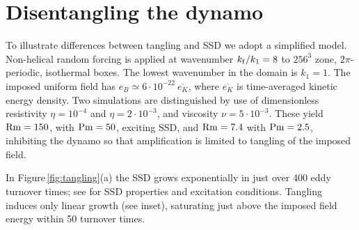 \documentclass[preprint2]{aastex63}
\newcommand\Rm{{\rm Rm} }
\newcommand\Pm{{\rm Pm} }
\newcommand\kf{k_{\rm f} }
\begin{document}
\section{Disentangling the dynamo} \label{sec:ssd-tang}

 To illustrate differences between tangling and SSD we adopt a simplified
 model.
 Non-helical random forcing is applied at wavenumber $\kf/k_1=8$ to
 $256^3$ zone, $2\pi$-periodic, isothermal boxes.
 The lowest wavenumber in the domain is $k_1=1$.
 The imposed uniform field has $e_B\simeq6\cdot10^{-22}~\overline{e_K}$, where
 $\overline{e_K}$ is time-averaged kinetic energy density.
 Two simulations are distinguished by use of dimensionless
 resistivity $\eta=10^{-4}$
 and $\eta=2\cdot10^{-3}$, and viscosity $\nu=5\cdot10^{-3}$.
 These yield $\Rm=150$, with $\Pm = 50$, exciting SSD, and $\Rm=7.4$ with
 $\Pm=2.5$, inhibiting the dynamo so that amplification is limited to tangling
 of the imposed field.

 In Figure\,\ref{fig:tangling}(a) the SSD grows exponentially in just over 400
 eddy turnover times; see \cite{ZRS83} for SSD properties and excitation
 conditions.
 Tangling induces only linear growth (see inset), saturating just above
 the imposed field energy within 50 turnover times.
\end{document}
